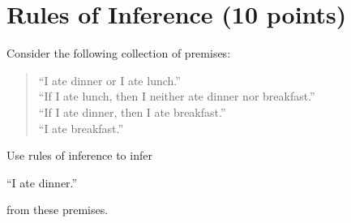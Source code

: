 \documentclass[11pt]{article}
\def\sectionOneA#1{}
\def\sectionOneB#1{}
\def\sectionTwoA#1{#1}
\def\sectionTwoB#1{}
\def\sectionVicsection#1{}
\newcounter{pgpts}
\newcounter{cumpts}
\newcommand{\cnewpage}{\addtocounter{cumpts}{\value{pgpts}}\newpage\setcounter{pgpts}{0}}
\begin{document}
\cnewpage





\section{Rules of Inference (10 points)}\addtocounter{pgpts}{10}

Consider the following collection of premises:
\begin{quote}
\sectionOneA{
``I am smart or I am lucky.''\\
  ``If I am lucky then both I will win the lottery and I am not smart.''\\
  ``If I am smart, then I will not win the lottery.''\\
``I will not win the lottery.''\\
  }
\sectionOneB{ %
``I am smart or I am lucky.''\\
``I am not smart.''\\
  ``If I am lucky then I will win the lottery.''}
  
\sectionTwoA{
``I ate dinner or I ate lunch.''\\
``If I ate lunch, then I neither ate dinner nor breakfast.''\\
  ``If I ate dinner, then I ate breakfast.''\\
  ``I ate breakfast.''}

  
\sectionTwoB{ %
``I am lucky then I will win the lottery.''\\
``If I win the lottery then I am smart.''\\
  ``I am not smart.''}
\sectionVicsection{
``If Dracula is out, then it is raining or it is night or the full moon shines.''\\
``Dracula is out.''\\
``It is not raining.''\\
``Whenever the full moon shines, it is night.''}
\end{quote}
Use rules of inference to infer
\sectionOneA{``I am smart.''}
\sectionOneB{``I will win the lottery.''} %
\sectionTwoA{``I ate dinner.''}
\sectionTwoB{``I am not lucky.''} %
\sectionVicsection{``It is night.''}
from these premises. 
\end{document}
